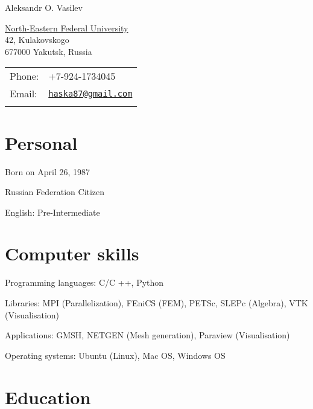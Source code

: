 \documentclass[a4paper]{article}
\def\name{Aleksandr O. Vasilev}
\renewenvironment{itemize}{
  \begin{list}{}{
    \setlength{\leftmargin}{1.5em}
  }
}{
  \end{list}
}
\begin{document}
{\huge \name}


\vspace{0.25in}

\begin{minipage}{0.45\linewidth}
  \href{http://www.s-vfu.ru/user/user.php?id=732071}{North-Eastern Federal University} \\
  42, Kulakovskogo \\
  677000 Yakutsk, Russia
\end{minipage}
\begin{minipage}{0.45\linewidth}
  \begin{tabular}{ll}
    Phone: & +7-924-1734045 \\
    Email: & \href{mailto:haska87@gmail.com}{\tt haska87@gmail.com}  \\ \\
  \end{tabular}
\end{minipage}

\section*{Personal}

\begin{itemize}
\item Born on April 26, 1987
\item Russian Federation Citizen
\item English: Pre-Intermediate
\end{itemize}

\section*{Computer skills}

\begin{itemize}
\item Programming languages: C/C ++, Python
\item Libraries: MPI (Parallelization), FEniCS (FEM), PETSc, SLEPc (Algebra), VTK (Visualisation)
\item Applications: GMSH, NETGEN (Mesh generation), Paraview (Visualisation)
\item Operating systems: Ubuntu (Linux), Mac OS, Windows OS
\end{itemize}


\section*{Education}
\end{document}
